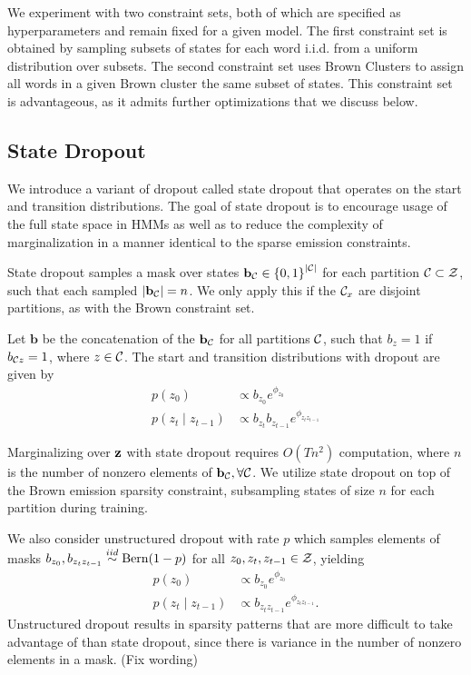 \documentclass[11pt,a4paper]{article}
\begin{document}
We experiment with two constraint sets, both of which are specified 
as hyperparameters and remain fixed for a given model.
The first constraint set is obtained by sampling subsets of
states for each word i.i.d. from a uniform distribution over subsets.
The second constraint set uses Brown Clusters \citep{brown1992}
to assign all words in a given Brown cluster the same subset of states.
This constraint set is advantageous, as it admits further optimizations
that we discuss below.


\subsection{State Dropout}
We introduce a variant of dropout called state dropout that operates on the
start and transition distributions.
The goal of state dropout is to encourage usage of the full state space in HMMs
as well as to reduce the complexity of marginalization in a manner
identical to the sparse emission constraints.

State dropout samples a mask over states
$\mathbf{b}_{\mathcal{C}} \in \left\{0,1\right\}^{|\mathcal{C}|}$ for each partition $\mathcal{C} \subset \mathcal{Z}$,
such that each sampled $|\mathbf{b}_{\mathcal{C}}| = n$.
We only apply this if the $\mathcal{C}_x$ are disjoint partitions,
as with the Brown constraint set.

Let $\mathbf{b}$ be the concatenation of the $\mathbf{b}_{\mathcal{C}}$ for all partitions $\mathcal{C}$,
such that $b_z = 1$ if $b_{\mathcal{C} z} = 1$, where $z \in \mathcal{C}$.
The start and transition distributions with dropout are given by
\begin{equation}
\label{eqn:state_dropout}
\begin{aligned}
p(z_0) &\propto b_{z_0}e^{\phi_{z_0}}\\
p(z_t \mid z_{t-1}) &\propto b_{z_t}b_{z_{t-1}}e^{\phi_{z_tz_{t-1}}}
\end{aligned}
\end{equation}

Marginalizing over $\mathbf{z}$ with state dropout requires $O(Tn^2)$ computation,
where $n$ is the number of nonzero elements of $\mathbf{b}_{\mathcal{C}}, \forall \mathcal{C}$.
We utilize state dropout on top of the Brown emission sparsity constraint,
subsampling states of size $n$ for each partition during training.

We also consider unstructured dropout with rate $p$
which samples elements of masks $b_{z_0}, b_{z_tz_{t-1}}\overset{iid}{\sim} \mathrm{Bern}(1-p)$
for all $z_0, z_t, z_{t-1}\in\mathcal{Z}$, yielding
\begin{equation}
\label{eqn:unstructured_dropout}
\begin{aligned}
p(z_0) &\propto b_{z_0}e^{\phi_{z_0}}\\
p(z_t \mid z_{t-1}) &\propto b_{z_tz_{t-1}}e^{\phi_{z_tz_{t-1}}}.
\end{aligned}
\end{equation}
Unstructured dropout results in sparsity patterns that are
more difficult to take advantage of than state dropout,
since there is variance in the number of nonzero elements
in a mask.
(Fix wording)
\end{document}
